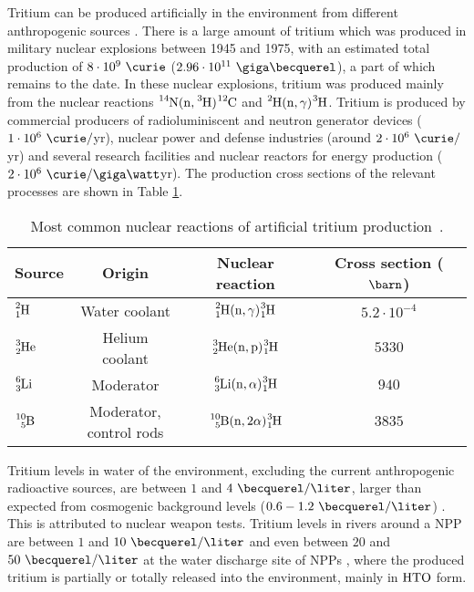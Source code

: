 Tritium can be produced artificially in the environment from different anthropogenic sources \cite{CommonEmissionTritium, TritiumHandling}. There is a large amount of tritium which was produced in military nuclear explosions between 1945 and 1975, with an estimated total production of $8 \cdot 10^9~\curie$ ($2.96 \cdot 10^{11}~\giga\becquerel$), a part of which remains to the date. In these nuclear explosions, tritium was produced mainly from the nuclear reactions $\ce{^{14}N}(\ce{n},\ce{^{3}H})\ce{^{12}C}$ and $\ce{^{2}H}(\ce{n},\gamma)\ce{^{3}H}$. Tritium is produced by commercial producers of radioluminiscent and neutron generator devices ($1 \cdot 10^6~\curie/$yr), nuclear power and defense industries (around $2 \cdot 10^6~\curie/$yr) and several research facilities and nuclear reactors for energy production ($2 \cdot 10^6~\curie/\giga\watt$yr). The production cross sections of the relevant processes are shown in Table \ref{tab:NuclearReactionsTritiumProduction}.

\begin{table}[htbp]
\centering{}%
\begin{tabular}{lccc}
\toprule 
Source & Origin & Nuclear reaction & Cross section ($\barn$)\tabularnewline
\midrule
\midrule 
$\ce{^{2}_{1}H}$ & Water coolant & $\ce{^{2}_{1}H}(\ce{n},\gamma)\ce{^{3}_{1}H}$ & $5.2 \cdot{} 10^{-4}$ \tabularnewline
$\ce{^{3}_{2}He}$ & Helium coolant & $\ce{^{3}_{2}He}(\ce{n},\ce{p})\ce{^{3}_{1}H}$ & $5330$ \tabularnewline
\vspace{0.1cm}$\ce{^{6}_{3}Li}$ & Moderator & $\ce{^{6}_{3}Li}(\ce{n},\alpha)\ce{^{3}_{1}H}$ & $940$ \tabularnewline
$\ce{^{10}_{5}B}$ & \parbox{8em}{\centering Moderator,\\ control rods} & $\ce{^{10}_{5}B}(\ce{n},2\alpha)\ce{^{3}_{1}H}$ & $3835$ \tabularnewline 
\bottomrule
\end{tabular}
\caption{Most common nuclear reactions of artificial tritium production~\cite{CommonEmissionTritium}.}
\label{tab:NuclearReactionsTritiumProduction}
\end{table}

Tritium levels in water of the environment, excluding the current anthropogenic radioactive sources, are between $1$ and $4~\becquerel/\liter$, larger than expected from cosmogenic background levels ($0.6-1.2~\becquerel/\liter$) \cite{FranceTritiumEnvironment}. This is attributed to nuclear weapon tests. Tritium levels in rivers around a NPP are between $1$ and $10~\becquerel/\liter$ and even between $20$ and $50~\becquerel/\liter$ at the water discharge site of NPPs \cite{FranceTritiumEnvironment}, where the produced tritium is partially or totally released into the environment, mainly in $\ce{HTO}$ form.


